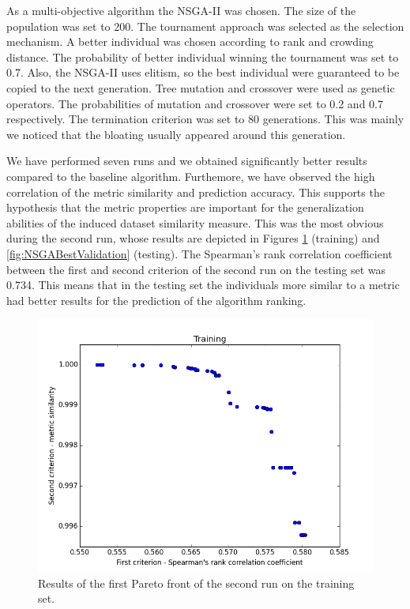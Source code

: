 As a multi-objective algorithm the NSGA-II was chosen. The size of the population was set to 200. The tournament approach was selected as the selection mechanism. A better individual was chosen according to rank and crowding distance. The probability of better individual winning the tournament was set to 0.7. Also, the NSGA-II uses elitism, so the best individual were guaranteed to be copied to the next generation. Tree mutation and crossover were used as genetic operators. The probabilities of mutation and crossover were set to 0.2 and 0.7 respectively. The termination criterion was set to 80 generations. This was mainly we noticed that the bloating usually appeared around this generation.
 
 We have performed seven runs and we obtained significantly better results compared to the baseline algorithm. Furthemore, we have observed the high correlation of the metric similarity and prediction accuracy. This supports the hypothesis that the metric properties are important for the generalization abilities of the induced dataset similarity measure. This was the most obvious during the second run, whose results are depicted in Figures \ref{fig:NSGABestTraining} (training) and \ref{fig:NSGABestValidation} (testing). The Spearman’s rank correlation coefficient between the first and second criterion of the second run on the testing set was 0.734. This means that in the testing set the individuals more similar to a metric had better results for the prediction of the algorithm ranking.
 
\begin{figure}	
	\includegraphics[width=\columnwidth]{Images/nsgaTraining.PNG}
	\centering
	\caption{Results of the first Pareto front of the second run on the training set.}	
	\label{fig:NSGABestTraining}
\end{figure}


